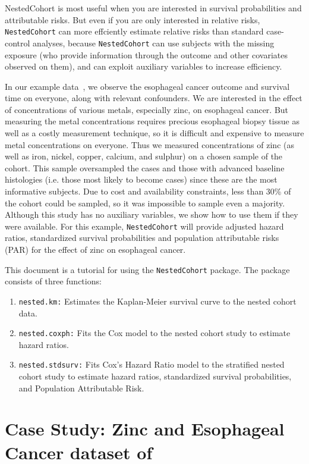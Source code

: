 \documentclass[10pt]{article}
\begin{document}
NestedCohort is most useful when you are interested in survival probabilities and
attributable risks.  But even if you are only interested in relative risks,
\texttt{NestedCohort} can more effciently estimate relative risks than standard
case-control analyses, because \texttt{NestedCohort} can use subjects with the missing
exposure (who provide information through the outcome and other covariates observed on
them), and can exploit auxiliary variables to increase efficiency.

In our example data~\cite{Abnet:05}, we observe the esophageal cancer outcome and survival
time on everyone, along with relevant confounders.  We are interested in the effect of
concentrations of various metals, especially zinc, on esophageal cancer.  But measuring
the metal concentrations requires precious esophageal biopsy tissue as well as a costly
measurement technique, so it is difficult and expensive to measure metal concentrations on
everyone.  Thus we measured concentrations of zinc (as well as iron, nickel, copper,
calcium, and sulphur) on a chosen sample of the cohort.  This sample oversampled the cases
and those with advanced baseline histologies (i.e. those most likely to become cases)
since these are the most informative subjects.  Due to cost and availability constraints,
less than 30\% of the cohort could be sampled, so it was impossible to sample even a
majority.  Although this study has no auxiliary variables, we show how to use them if they
were available.  For this example, \texttt{NestedCohort} will provide adjusted hazard
ratios, standardized survival probabilities and population attributable risks (PAR) for
the effect of zinc on esophageal cancer.


This document is a tutorial for using the \texttt{NestedCohort} package.  The package
consists of three functions:
\begin{enumerate}
\item \texttt{nested.km:} Estimates the Kaplan-Meier survival curve to the nested cohort
data.
\item \texttt{nested.coxph:} Fits the Cox model to the nested cohort study to estimate
hazard ratios.
\item \texttt{nested.stdsurv:} Fits Cox's Hazard Ratio model to the stratified nested
cohort study to estimate hazard ratios, standardized survival probabilities, and
Population Attributable Risk.
\end{enumerate}


\section{Case Study: Zinc and Esophageal Cancer dataset of~\cite{Abnet:05}}
\label{sec:case-study:-zinc}
\end{document}
